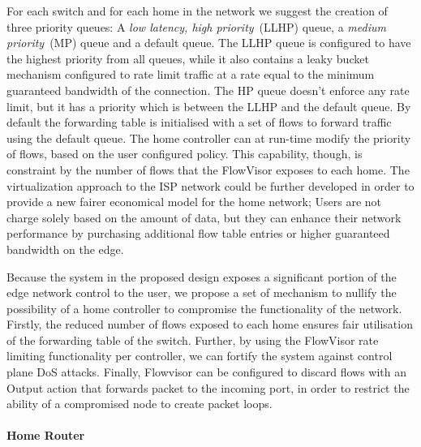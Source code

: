 For each switch and for each home in the network we suggest the creation of
three priority queues: A {\it low latency, high priority}~(LLHP) queue, a {\it
  medium priority}~(MP) queue and a default queue.  The LLHP queue is configured
to have the highest priority from all queues, while it also contains a leaky
bucket mechanism configured to rate limit traffic at a rate equal to the minimum
guaranteed bandwidth of the connection. The HP queue doesn't enforce any rate
limit, but it has a priority which is between the LLHP and the default queue.
By default the forwarding table is initialised with a set of flows to forward
traffic using the default queue. The home \of controller can at run-time modify
the priority of flows, based on the user configured policy.  This capability,
though, is constraint by the number of flows that the FlowVisor exposes to each
home.  The virtualization approach to the ISP network could be further developed
in order to provide a new fairer economical model for the home network; Users
are not charge solely based on the amount of data, but they can enhance their
network performance by purchasing additional flow table entries or higher
guaranteed bandwidth on the edge. 

Because the system in the proposed design exposes a significant portion of the
edge network control to the user, we propose a set of mechanism to nullify the
possibility of a home \of controller to compromise the functionality of the
network.  Firstly, the reduced number of flows exposed to each home ensures fair
utilisation of the forwarding table of the switch. Further, by using the
FlowVisor rate limiting functionality per controller, we can fortify the system
against control plane DoS attacks. Finally, Flowvisor can be configured to
discard flows with an Output action that forwards packet to the incoming port,
in order to restrict the ability of a compromised node to create packet loops. 

\paragraph*{Home Router}

